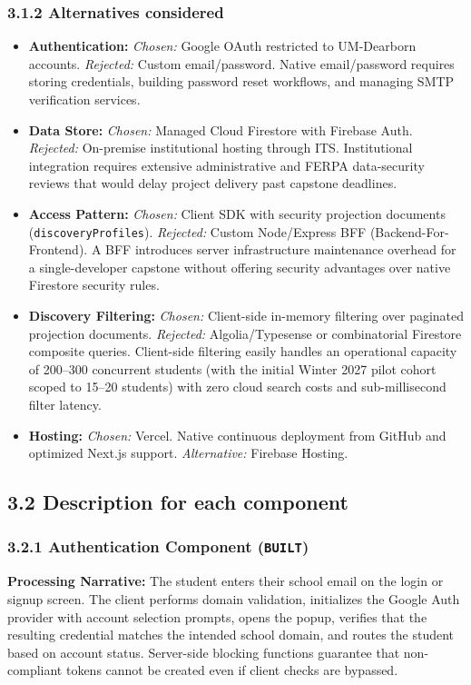\documentclass[11pt,letterpaper]{article}
\begin{document}
\subsubsection*{3.1.2 Alternatives considered}
\begin{itemize}[leftmargin=*,itemsep=3pt]
\item \textbf{Authentication:} \textit{Chosen:} Google OAuth restricted to UM-Dearborn accounts. \textit{Rejected:} Custom email/password. Native email/password requires storing credentials, building password reset workflows, and managing SMTP verification services.
\item \textbf{Data Store:} \textit{Chosen:} Managed Cloud Firestore with Firebase Auth. \textit{Rejected:} On-premise institutional hosting through ITS. Institutional integration requires extensive administrative and FERPA data-security reviews that would delay project delivery past capstone deadlines.
\item \textbf{Access Pattern:} \textit{Chosen:} Client SDK with security projection documents (\texttt{discoveryProfiles}). \textit{Rejected:} Custom Node/Express BFF (Backend-For-Frontend). A BFF introduces server infrastructure maintenance overhead for a single-developer capstone without offering security advantages over native Firestore security rules.
\item \textbf{Discovery Filtering:} \textit{Chosen:} Client-side in-memory filtering over paginated projection documents. \textit{Rejected:} Algolia/Typesense or combinatorial Firestore composite queries. Client-side filtering easily handles an operational capacity of 200--300 concurrent students (with the initial Winter 2027 pilot cohort scoped to 15--20 students) with zero cloud search costs and sub-millisecond filter latency.
\item \textbf{Hosting:} \textit{Chosen:} Vercel. Native continuous deployment from GitHub and optimized Next.js support. \textit{Alternative:} Firebase Hosting.
\end{itemize}

\subsection*{3.2 Description for each component}

\subsubsection*{3.2.1 Authentication Component (\texttt{BUILT})}
\textbf{Processing Narrative:} The student enters their school email on the login or signup screen. The client performs domain validation, initializes the Google Auth provider with account selection prompts, opens the popup, verifies that the resulting credential matches the intended school domain, and routes the student based on account status. Server-side blocking functions guarantee that non-compliant tokens cannot be created even if client checks are bypassed.
\end{document}
